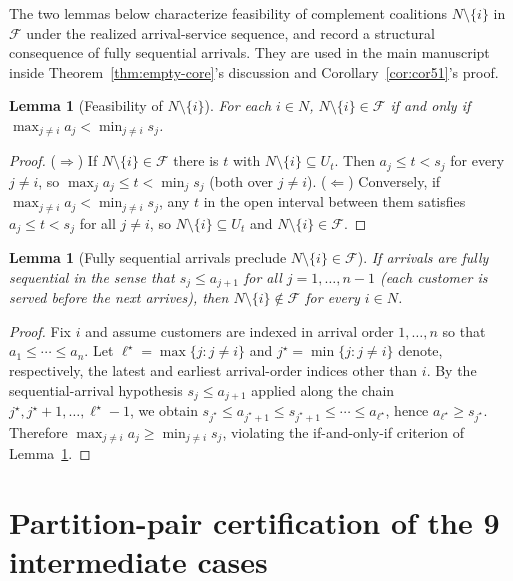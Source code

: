 \documentclass[11pt]{article}
\newcommand{\F}{\mathcal{F}}
\theoremstyle{plain}
\newtheorem{lemma}[theorem]{Lemma}
\theoremstyle{definition}
\theoremstyle{remark}
\begin{document}
The two lemmas below characterize feasibility of complement coalitions
$N\setminus\{i\}$ in $\F$ under the realized arrival-service sequence, and
record a structural consequence of fully sequential arrivals. They are
used in the main manuscript inside Theorem~\ref{thm:empty-core}'s
discussion and Corollary~\ref{cor:cor51}'s proof.

\begin{lemma}[Feasibility of $N\setminus\{i\}$]
\label{lem:lemma51}
For each $i\in N$, $N\setminus\{i\}\in\F$ if and only if $\max_{j\neq i} a_j < \min_{j\neq i} s_j$.
\end{lemma}

\begin{proof}
($\Rightarrow$) If $N\setminus\{i\}\in\F$ there is $t$ with $N\setminus\{i\}\subseteq U_t$. Then $a_j\le t < s_j$ for every $j\neq i$, so $\max_j a_j \le t < \min_j s_j$ (both over $j\neq i$). ($\Leftarrow$) Conversely, if $\max_{j\neq i} a_j < \min_{j\neq i} s_j$, any $t$ in the open interval between them satisfies $a_j\le t<s_j$ for all $j\neq i$, so $N\setminus\{i\}\subseteq U_t$ and $N\setminus\{i\}\in\F$.
\end{proof}

\begin{lemma}[Fully sequential arrivals preclude $N\setminus\{i\}\in\F$]
\label{lem:lemma52}
If arrivals are fully sequential in the sense that $s_j \le a_{j+1}$ for all $j=1,\ldots,n-1$ (each customer is served before the next arrives), then $N\setminus\{i\}\notin\F$ for every $i\in N$.
\end{lemma}

\begin{proof}
Fix $i$ and assume customers are indexed in arrival order $1,\ldots,n$ so that $a_1 \le \cdots \le a_n$. Let $\ell^{\star}=\max\{j:j\neq i\}$ and $j^{\star}=\min\{j:j\neq i\}$ denote, respectively, the latest and earliest arrival-order indices other than $i$. By the sequential-arrival hypothesis $s_j \le a_{j+1}$ applied along the chain $j^{\star}, j^{\star}+1, \ldots, \ell^{\star}-1$, we obtain $s_{j^{\star}} \le a_{j^{\star}+1} \le s_{j^{\star}+1} \le \cdots \le a_{\ell^{\star}}$, hence $a_{\ell^{\star}} \ge s_{j^{\star}}$. Therefore $\max_{j\neq i} a_j \ge \min_{j\neq i} s_j$, violating the if-and-only-if criterion of Lemma~\ref{lem:lemma51}.
\end{proof}

\section{Partition-pair certification of the 9 intermediate cases}
\label{app:partition-pair-cases}
\end{document}
